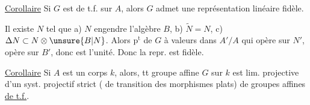 
\margin{\rule{.04em}{1.5em}}\uline{Corollaire} Si  $G$ est de t.f. sur $A$, alors $G$ admet une représentation linéaire fidèle.

Il existe $N$ tel que a) $N$ engendre l'algèbre $B$, b) $\widetilde N=N$, c) $\Delta N\subset N\otimes \unsure{B|N}$.
 Alors   $\mathrm p^{\mathrm t}$ de $G$ à valeurs dans $A'/A$ qui opère  sur $N'$, opère  sur $B'$,  donc est  l'unité. Donc la repr. est fidèle.

\uline{Corollaire} Si $A$ est un corps $k$, alors, tt groupe affine  $G$ sur $k$ est lim.  projective d'un syst. projectif strict ( de transition des morphismes  plats) de groupes affines \uline{de t.f.}.
